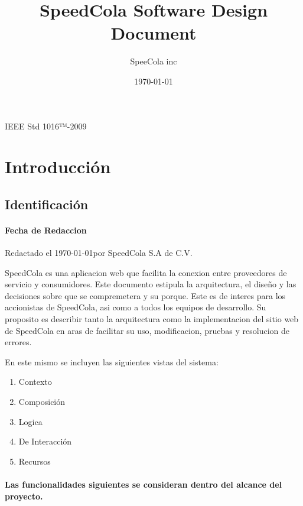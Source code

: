 \documentclass{article}
\title{SpeedCola Software Design Document}
\date{\today}%
\author{SpeeCola inc}%
\begin{document}
\maketitle
IEEE Std 1016™-2009

\newpage
{}

\section{Introducci\'on}
  \iffalse  
  ⎯ Date of issue and status
  ⎯ Scope
  ⎯ Issuing organization
  ⎯ Authorship (responsibility or copyright information)
  ⎯ References
  \fi
  \subsection{Identificaci\'on}
  \paragraph {Fecha de Redaccion} Redactado el \today \space por SpeedCola S.A de C.V.\newline

  SpeedCola es una aplicacion web que facilita la conexion entre proveedores de servicio y consumidores. 
  Este documento estipula la arquitectura, el dise\~no y 
    las decisiones sobre que se compremetera y su porque. Este es de interes para los accionistas de SpeedCola, asi como a todos los equipos de desarrollo. Su proposito es describir tanto la arquitectura como la implementacion del sitio web de  
  SpeedCola en aras de facilitar su uso, modificacion, pruebas y resolucion de errores.

    En este mismo se incluyen las siguientes vistas del sistema:
    \begin{multicols}{2}
    \begin{enumerate}

      \item Contexto
      \item Composici\'on 
      \item Logica
      \item De Interacci\'on
      \item Recursos

    \end{enumerate}
  \end{multicols}

  \paragraph{Las funcionalidades siguientes se consideran dentro del alcance del proyecto.}
\end{document}
